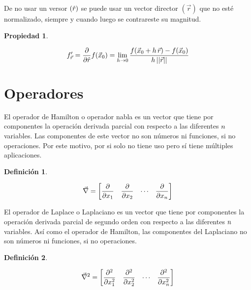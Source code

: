 \documentclass[a5paper,12pt,twoside]{book}
\newtheorem{defn}{{Definición}}[chapter]
\newtheorem{prop}{{Propiedad}}[chapter]
\begin{document}
De no usar un versor $(\hat{r})$ se puede usar un vector director $(\Vec{r})$ que no esté normalizado, siempre y cuando luego se contrareste su magnitud.

\begin{mdframed}[style=PropertyFrame]
    \begin{prop}
    \end{prop}
    \begin{equation*}
        f_{\Vec{r}}' = \frac{\partial}{\partial \hat{r}} f(\Vec{x}_0) = \lim_{h \to 0} \dfrac{f(\Vec{x}_0+h\,\Vec{r})-f(\Vec{x}_0)}{h\, {\left|\left| {\Vec{r}} \right|\right|}}
    \end{equation*}
\end{mdframed}


\section{Operadores}

El operador de Hamilton o operador nabla es un vector que tiene por componentes la operación derivada parcial con respecto a las diferentes $n$ variables.
Las componentes de este vector no son números ni funciones, si no operaciones.
Por este motivo, por si solo no tiene uso pero sí tiene múltiples aplicaciones.

\begin{mdframed}[style=DefinitionFrame]
    \begin{defn}
    \end{defn}
    \begin{equation*}
        \Vec{\nabla} = \begin{bmatrix} \dfrac{\partial}{\partial x_1} & \dfrac{\partial}{\partial x_2} & \cdots & \dfrac{\partial}{\partial x_n} \end{bmatrix}
    \end{equation*}
\end{mdframed}

El operador de Laplace o Laplaciano es un vector que tiene por componentes la operación derivada parcial de segundo orden con respecto a las diferentes $n$ variables.
Así como el operador de Hamilton, las componentes del Laplaciano no son números ni funciones, si no operaciones.

\begin{mdframed}[style=DefinitionFrame]
    \begin{defn}
    \end{defn}
    \begin{equation*}
        \Vec{\nabla}^2 = \begin{bmatrix} \dfrac{\partial^2}{\partial x_1^2} & \dfrac{\partial^2}{\partial x_2^2} & \cdots & \dfrac{\partial^2}{\partial x_n^2} \end{bmatrix}
    \end{equation*}
\end{mdframed}
\end{document}
